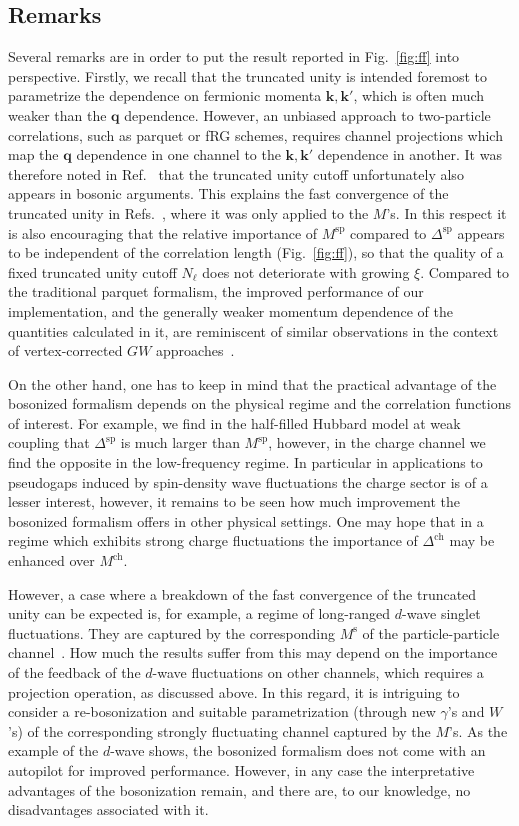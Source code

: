 \documentclass[epj]{svjour}
\newcommand{\kv}{\ensuremath{\mathbf{k}}}
\newcommand{\qv}{\ensuremath{\mathbf{q}}}
\newcommand{\ch}{\ensuremath{\text{ch}}}
\newcommand{\sz}{\ensuremath{\text{sp}}}
\newcommand{\sing}{\ensuremath{\text{s}}}
\begin{document}
\subsection{Remarks}
Several remarks are in order to put the result reported in Fig.~\ref{fig:ff} into perspective.
Firstly, we recall that the truncated unity is intended foremost to parametrize the
dependence on fermionic momenta $\kv,\kv'$, which is often much weaker than the $\qv$ dependence.
However, an unbiased approach to two-particle correlations, such as parquet or fRG schemes,
requires channel projections which map the $\qv$ dependence in one channel to the $\kv,\kv'$
dependence in another. It was therefore noted in Ref.~\cite{Eckhardt20} that the truncated unity cutoff
unfortunately also appears in bosonic arguments.
This explains the fast convergence of the truncated unity in Refs.~\cite{Krien20,Krien20-2},
where it was only applied to the $M$'s.
In this respect it is also encouraging that the relative importance of $M^\sz$ compared to $\Delta^\sz$
appears to be independent of the correlation length (Fig.~\ref{fig:ff}),
so that the quality of a fixed truncated unity cutoff $N_\ell$ does not deteriorate with growing $\xi$.
Compared to the traditional parquet formalism, the improved performance of our
implementation, and the generally weaker momentum dependence of the quantities calculated in it,
are reminiscent of similar observations in the context of
vertex-corrected $GW$ approaches~\cite{Kotliar06,Kutepov16}.

On the other hand, one has to keep in mind that the practical advantage of the bosonized formalism depends on the physical
regime and the correlation functions of interest.
For example, we find in the half-filled Hubbard model at weak coupling
that $\Delta^\sz$ is much larger than $M^\sz$, however, in the charge channel we find the opposite in the
low-frequency regime. In particular in applications to pseudogaps induced by spin-density wave
fluctuations the charge sector is of a lesser interest, however,
it remains to be seen how much improvement the bosonized formalism offers in other physical settings.
One may hope that in a regime which exhibits strong charge fluctuations the importance of $\Delta^\ch$ may
be enhanced over $M^\ch$.

However, a case where a breakdown of the fast convergence of the truncated unity can be expected is,
for example, a regime of long-ranged $d$-wave singlet fluctuations.
They are captured by the corresponding $M^\sing$ of the particle-particle channel~\cite{Bonetti22}.
How much the results suffer from this may depend on the importance
of the feedback of the $d$-wave fluctuations on other channels,
which requires a projection operation, as discussed above.
In this regard, it is intriguing to consider a re-bosonization and suitable parametrization
(through new $\gamma$'s and $W$'s) of the corresponding strongly fluctuating channel captured by the $M$'s.
As the example of the $d$-wave shows, the bosonized formalism does not come with
an autopilot for improved performance.
However, in any case the interpretative advantages of the bosonization remain,
and there are, to our knowledge, no disadvantages associated with it.
\end{document}
